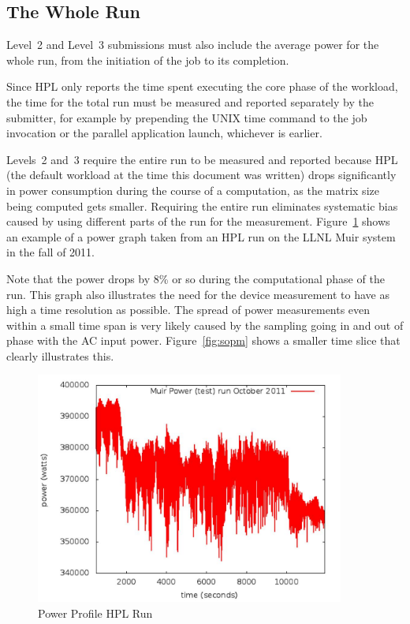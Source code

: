 \subsection{The Whole Run}

Level~2 and Level~3 submissions must also include the average power for the whole run, from the initiation of the job to its completion.

Since HPL only reports the time spent executing the core phase of the workload, the time for the total run must be measured and reported separately by the submitter, for example by prepending the UNIX time command to the job invocation or the parallel application launch, whichever is earlier.

Levels~2 and~3 require the entire run to be measured and reported because HPL (the default workload at the time this document was written) drops significantly in power consumption during the course of a computation, as the matrix size being computed gets smaller.
Requiring the entire run eliminates systematic bias caused by using different parts of the run for the measurement.
Figure~\ref{fig:powprof} shows an example of a power graph taken from an HPL run on the LLNL Muir system in the fall of 2011.

Note that the power drops by 8\% or so during the computational phase of the run.
This graph also illustrates the need for the device measurement to have as high a time resolution as possible.
The spread of power measurements even within a small time span is very likely caused by the sampling going in and out of phase with the AC input power.
Figure~\ref{fig:sopm} shows a smaller time slice that clearly illustrates this.


\begin{figure}
\centering
\includegraphics[width=4in]{fig3-1}
\caption{Power Profile HPL Run}
\label{fig:powprof}
\end{figure}

